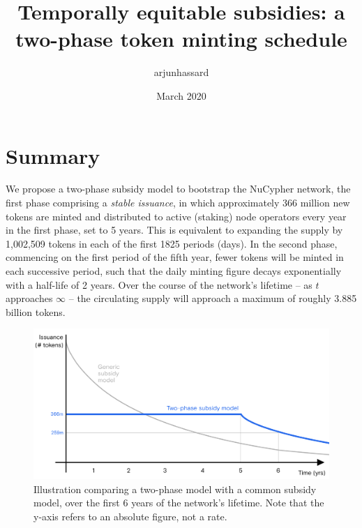 \documentclass[8pt]{article}
\title{Temporally equitable subsidies: a two-phase token minting schedule}
\author{arjunhassard}
\date{March 2020}
\begin{document}
\maketitle

\section{Summary}

We propose a two-phase subsidy model to bootstrap the NuCypher network, the first phase comprising a \textit{stable issuance}, in which approximately 366 million new tokens are minted and distributed to active (staking) node operators every year in the first phase, set to 5 years. This is equivalent to expanding the supply by 1,002,509 tokens in each of the first 1825 periods (days). In the second phase, commencing on the first period of the fifth year, fewer tokens will be minted in each successive period, such that the daily minting figure decays exponentially with a half-life of 2 years. Over the course of the network's lifetime – as $t$ approaches $\infty$ – the circulating supply will approach a maximum of roughly 3.885 billion tokens. 

\begin{figure}[h!]
    \includegraphics[width=\textwidth]{Two_phase_model.png}
    \caption{Illustration comparing a two-phase model with a common subsidy model, over the first 6 years of the network's lifetime. Note that the y-axis refers to an absolute figure, not a rate.}
    \label{fig:tp}
\end{figure}
\end{document}
